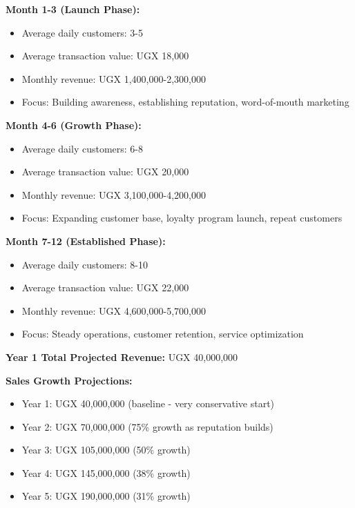 \documentclass[a4paper,12pt]{article}
\begin{document}
\textbf{Month 1-3 (Launch Phase):}
\begin{itemize}[leftmargin=2em]
    \item Average daily customers: 3-5
    \item Average transaction value: UGX 18,000
    \item Monthly revenue: UGX 1,400,000-2,300,000
    \item Focus: Building awareness, establishing reputation, word-of-mouth marketing
\end{itemize}

\textbf{Month 4-6 (Growth Phase):}
\begin{itemize}[leftmargin=2em]
    \item Average daily customers: 6-8
    \item Average transaction value: UGX 20,000
    \item Monthly revenue: UGX 3,100,000-4,200,000
    \item Focus: Expanding customer base, loyalty program launch, repeat customers
\end{itemize}

\textbf{Month 7-12 (Established Phase):}
\begin{itemize}[leftmargin=2em]
    \item Average daily customers: 8-10
    \item Average transaction value: UGX 22,000
    \item Monthly revenue: UGX 4,600,000-5,700,000
    \item Focus: Steady operations, customer retention, service optimization
\end{itemize}

\textbf{Year 1 Total Projected Revenue:} UGX 40,000,000

\textbf{Sales Growth Projections:}
\begin{itemize}[leftmargin=2em]
    \item Year 1: UGX 40,000,000 (baseline - very conservative start)
    \item Year 2: UGX 70,000,000 (75\% growth as reputation builds)
    \item Year 3: UGX 105,000,000 (50\% growth)
    \item Year 4: UGX 145,000,000 (38\% growth)
    \item Year 5: UGX 190,000,000 (31\% growth)
\end{itemize}

\vspace{1em}
\end{document}
